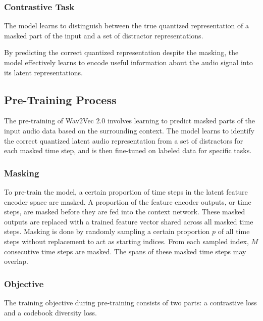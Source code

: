 \documentclass{article}
\begin{document}
\subsubsection{Contrastive Task}

The model learns to distinguish between the true quantized representation of a masked part of the input and a set of distractor representations.

By predicting the correct quantized representation despite the masking, the model effectively learns to encode useful information about the audio signal into its latent representations.

\pagebreak


\subsection*{Pre-Training Process}

The pre-training of Wav2Vec 2.0 involves learning to predict masked parts of the input audio data based on the surrounding context. The model learns to identify the correct quantized latent audio representation from a set of distractors for each masked time step, and is then fine-tuned on labeled data for specific tasks.

\subsubsection{Masking}

To pre-train the model, a certain proportion of time steps in the latent feature encoder space are masked. A proportion of the feature encoder outputs, or time steps, are masked before they are fed into the context network. These masked outputs are replaced with a trained feature vector shared across all masked time steps. Masking is done by randomly sampling a certain proportion \( p \) of all time steps without replacement to act as starting indices. From each sampled index, \( M \) consecutive time steps are masked. The spans of these masked time steps may overlap.

\subsubsection{Objective}
The training objective during pre-training consists of two parts: a contrastive loss and a codebook diversity loss.
\end{document}
